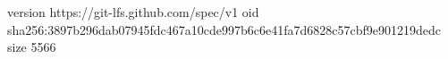 version https://git-lfs.github.com/spec/v1
oid sha256:3897b296dab07945fdc467a10cde997b6c6e41fa7d6828c57cbf9e901219dedc
size 5566
